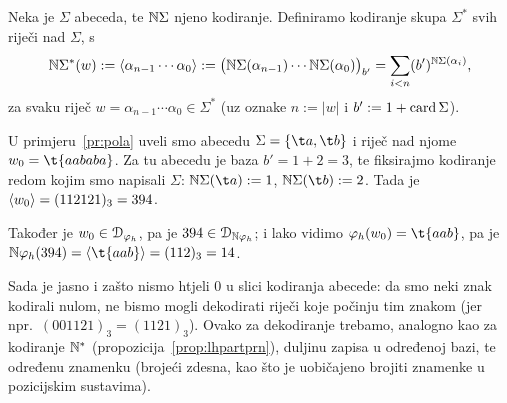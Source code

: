 \begin{definicija}
Neka je $\Sigma$ abeceda, te ${\mathbb N}\Sigma$ njeno kodiranje. Definiramo kodiranje skupa $\Sigma^*$ svih riječi nad $\Sigma$, s
\begin{equation}
    {\mathbb N}\Sigma^*(w):=\langle\alpha_{n-1}\dotsm\alpha_0\rangle:=\bigl({\mathbb N}\Sigma(\alpha_{n-1})\dotsm{\mathbb N}\Sigma(\alpha_0)\bigr)_{b'}=\sum_{i<n}(b')^{{\mathbb N}\Sigma(\alpha_i)}\text,
\end{equation}
za svaku riječ $w=\alpha_{n-1}\dotsm\alpha_0\in\Sigma^*$ (uz oznake $n:=\left|w\right|$ i $b':=1+\operatorname{card}\Sigma$).
\end{definicija}

\begin{primjer}
U primjeru~\ref{pr:pola} uveli smo abecedu $\Sigma=\{\t a,\t b\}$ i riječ nad njome $w_0=\t{aababa}$. Za tu abecedu je baza $b'=1+2=3$, te fiksirajmo kodiranje redom kojim smo napisali $\Sigma$: $\N\Sigma(\t a):=1$, $\N\Sigma(\t b):=2$. Tada je $\langle w_0\rangle=(112121)_3=394$.

Također je $w_0\in\mathcal D_{\varphi_h}$, pa je $394\in\mathcal D_{{\mathbb N}\varphi_h}$; i lako vidimo $\varphi_h(w_0)=\t{aab}$, pa je
$\N\varphi_h(394)=\kr{\t{aab}}=(112)_3=14$.
\end{primjer}

Sada je jasno i zašto nismo htjeli $0$ u slici kodiranja abecede: da smo neki znak kodirali nulom, ne bismo mogli dekodirati riječi koje počinju tim znakom (jer npr.\ $(001121)_3=(1121)_3$). Ovako za dekodiranje trebamo, analogno kao za kodiranje ${\mathbb N}^*$ (propozicija~\ref{prop:lhpartprn}), duljinu zapisa u određenoj bazi, te određenu znamenku (brojeći zdesna, kao što je uobičajeno brojiti znamenke u pozicijskim sustavima).


